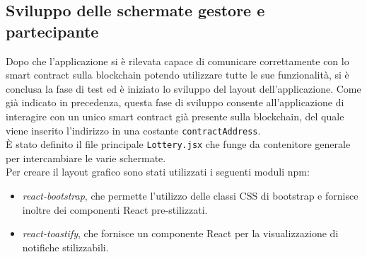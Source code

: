 \documentclass[12pt,a4paper,openright,twoside]{report}
\begin{document}
\subsection{Sviluppo delle schermate gestore e partecipante}
Dopo che l'applicazione si è rilevata capace di comunicare correttamente con lo smart contract sulla blockchain potendo utilizzare tutte le sue funzionalità, si è conclusa la fase di test ed è iniziato lo sviluppo del layout dell'applicazione. Come già indicato in precedenza, questa fase di sviluppo consente all'applicazione di interagire con un unico smart contract già presente sulla blockchain, del quale viene inserito l'indirizzo in una costante \texttt{contractAddress}.\\ 
È stato definito il file principale \texttt{Lottery.jsx} che funge da contenitore generale per intercambiare le varie schermate.\\
Per creare il layout grafico sono stati utilizzati i seguenti moduli npm:
\begin{itemize}
    \item \textit{react-bootstrap}, che permette l'utilizzo delle classi CSS di bootstrap e fornisce inoltre dei componenti React pre-stilizzati.
    \item \textit{react-toastify}, che fornisce un componente React per la visualizzazione di notifiche stilizzabili.
\end{itemize}
\end{document}
